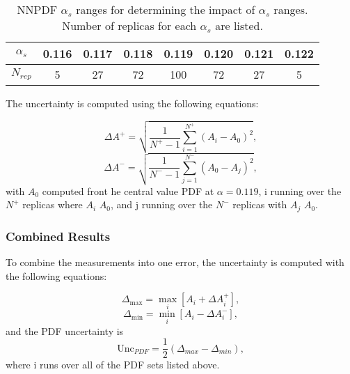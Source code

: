 \begin{table}[h]
\caption{\label{tab:nnPDFsets} NNPDF $\alpha _s$ ranges for determining the impact of $\alpha _s$ ranges. Number of replicas for each $\alpha _s$ are listed.}
\begin{center}
\begin{tabular}{c|ccccccc}\hline
$\alpha _s$         &  0.116 & 0.117 & 0.118 & 0.119 & 0.120 & 0.121 & 0.122 \\ \hline
$N_{rep}$                &  5         &  27      &  72      &   100   &  72     &   27    &    5       \\
\hline
\end{tabular}
\end{center}
\end{table}

The uncertainty is computed using the following equations:

\begin{equation}
\Delta A ^{+} = \sqrt{  \frac{1}{N^{+} - 1} \sum \limits_{i=1}^{N^{+}} (A_i - A_0)^2},
\end{equation}
\begin{equation}
\Delta A ^{-} = \sqrt{  \frac{1}{N^{-} - 1} \sum \limits_{j=1}^{N^{-}} (A_0 - A_j)^2},
\end{equation}
with $A_0$ computed front he central value PDF at $\alpha = 0.119$, i running over the $N^{+}$ replicas where $A_i$ \gt $A_0$, and j running over the $N^{-}$ replicas with $A_j$ \lt $A_0$.\\

\subsubsection{Combined Results}
To combine the measurements into one error, the uncertainty is computed with the following equations:

\begin{equation}
\Delta _{\max} = \underset{i}{\max}  [A_i + \Delta A^{+} _i],
\end{equation}
\begin{equation}
\Delta _{\min} = \underset{i}{\min}  [A_i - \Delta A^{-} _i],
\end{equation}
and the PDF uncertainty is
\begin{equation}
\mathrm{Unc}_{PDF} = \frac{1}{2}(\Delta _{max} - \Delta _{min} ),
\end{equation}
where i runs over all of the PDF sets listed above.\\

